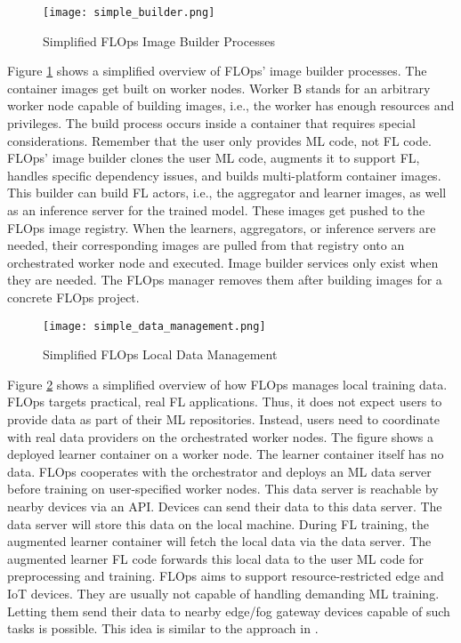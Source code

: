 \begin{figure}[h]
    \centering
    \texttt{[image: simple\_builder.png]}
    \caption{Simplified FLOps Image Builder Processes}
    \label{fig:flops_simple_image_builder}
\end{figure}

Figure \ref{fig:flops_simple_image_builder} shows a simplified overview of FLOps' image builder processes.
The container images get built on worker nodes.
Worker B stands for an arbitrary worker node capable of building images, i.e., the worker has enough resources and privileges.
The build process occurs inside a container that requires special considerations.
Remember that the user only provides ML code, not FL code.
FLOps' image builder clones the user ML code, augments it to support FL, handles specific dependency issues, and builds multi-platform container images.
This builder can build FL actors, i.e., the aggregator and learner images, as well as an inference server for the trained model.
These images get pushed to the FLOps image registry.
When the learners, aggregators, or inference servers are needed, their corresponding images are pulled from that registry onto an orchestrated worker node and executed.
Image builder services only exist when they are needed.
The FLOps manager removes them after building images for a concrete FLOps project.

\begin{figure}[H]
    \begin{adjustwidth}{-0.1\paperwidth}{-0.1\paperwidth}
        \centering
        \texttt{[image: simple\_data\_management.png]}
        \caption{Simplified FLOps Local Data Management}
        \label{fig:flops_simple_data_management}
    \end{adjustwidth}
\end{figure}

Figure \ref{fig:flops_simple_data_management} shows a simplified overview of how FLOps manages local training data.
FLOps targets practical, real FL applications.
Thus, it does not expect users to provide data as part of their ML repositories.
Instead, users need to coordinate with real data providers on the orchestrated worker nodes.
The figure shows a deployed learner container on a worker node.
The learner container itself has no data. 
FLOps cooperates with the orchestrator and deploys an ML data server before training on user-specified worker nodes.
This data server is reachable by nearby devices via an API.
Devices can send their data to this data server.
The data server will store this data on the local machine.
During FL training, the augmented learner container will fetch the local data via the data server.
The augmented learner FL code forwards this local data to the user ML code for preprocessing and training.
FLOps aims to support resource-restricted edge and IoT devices.
They are usually not capable of handling demanding ML training.
Letting them send their data to nearby edge/fog gateway devices capable of such tasks is possible.
This idea is similar to the approach in \cite{paper:global_fl_platform_for_iot}.



